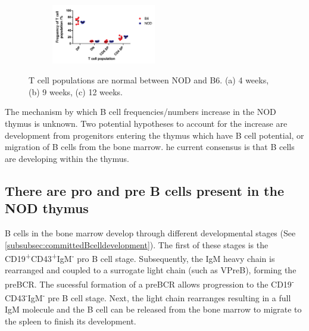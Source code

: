 \begin{figure}
\begin{subfigure}{0.5\textwidth}
	\caption{}
	\label{subfig:9wkThyTcells}
	\end{subfigure}
	\begin{subfigure}{\textwidth}
	\centering
 	\includegraphics[width=0.5\textwidth]{Figures/12wkThyTcells.pdf}
	\caption{}
	\label{subfig:12wkThyTcells}
	\end{subfigure}
\caption[T cell development is normal in the NOD mouse]{T cell populations are normal between NOD and B6. (a) 4 weeks, (b) 9 weeks, (c) 12 weeks.}
\label{fig:NODB6Tcells}
\end{figure}

The mechanism by which B cell frequencies/numbers increase in the NOD thymus is unknown. 
Two potential hypotheses to account for the increase are development from progenitors entering the thymus which have B cell potential, or migration of B cells from the bone marrow. \toref{}
he current consensus is that B cells are developing within the thymus. 


\subsection{There are pro and pre B cells present in the NOD thymus}
\label{subsec:proandpre}


B cells in the bone marrow develop through different developmental stages (See \cref{subsubsec:committedBcelldevelopment}).
The first of these stages is the CD19\textsuperscript{+}CD43\textsuperscript{+}IgM\textsuperscript{-} pro B cell stage.
Subsequently, the IgM heavy chain is rearranged and coupled to a surrogate light chain (such as VPreB), forming the preBCR. 
The sucessful formation of a preBCR allows progression to the CD19\textsuperscript{-}CD43\textsuperscript{-}IgM\textsuperscript{-} pre B cell stage.
Next, the light chain rearranges resulting in a full IgM molecule and the B cell can be released from the bone marrow to migrate to the spleen to finish its development.



